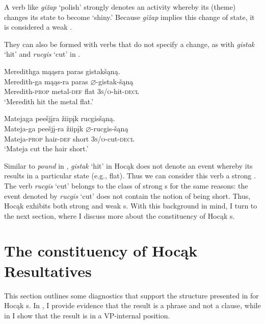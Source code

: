 \documentclass[output=paper]{LSP/langsci}
\begin{document}
A verb like \textit{gižap} `polish' strongly denotes an activity whereby its  (theme) changes its state to become `shiny.' Because \textit{gižap} implies this change of state, it is considered a weak . 

They can also be formed with verbs that do not specify a change, as with \textit{gistak} `hit' and \textit{rucgis} `cut' in .

\begin{exe}
\ex\label{ex:rosen:13}
\begin{xlist}

\ex \glll Meredithga mąąsra paras gistakšąną. \\
 Meredith-ga mąąs-ra paras {$\varnothing$}-gistak-šąną\\
Meredith-\textsc{prop} metal-\textsc{def} flat \textsc{3s/o}-hit-\textsc{decl}\\
\glt `Meredith hit the metal flat.'

\ex \glll Matejaga peešjįra žiipįk rucgisšąną.\\
Mateja-ga peešjį-ra žiipįk {$\varnothing$}-rucgis-šąną\\
Mateja-\textsc{prop} hair-\textsc{def} short \textsc{3s/o}-cut-\textsc{decl}\\
\glt `Mateja cut the hair short.'

\end{xlist}
\end{exe}
 
Similar to \textit{pound} in , \textit{gistak} `hit' in Hocąk does not denote an event whereby its  results in a particular state (e.g., flat). Thus we can consider this verb a strong . The verb \textit{rucgis} `cut' belongs to the class of strong s for the same reasons: the event denoted by \textit{rucgis} `cut' does not contain the notion of being short. Thus, Hocąk exhibits both strong and weak s. With this background in mind, I turn to the next section, where I discuss more about the constituency of Hocąk s.

\section{The constituency of Hocąk Resultatives}\label{sec:rosen:3}

This section outlines some diagnostics that support the structure presented in  for Hocąk s. In , I provide evidence that the result is a phrase and not a clause, while in  I show that the result is in a VP-internal position.
 
\end{document}
